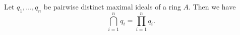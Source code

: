 Let $q_1, \ldots, q_n$ be pairwise distinct maximal ideals of a ring $A$. Then
we have
\[ \bigcap_{i = 1}^n q_i = \prod_{i = 1}^n q_i. \]
